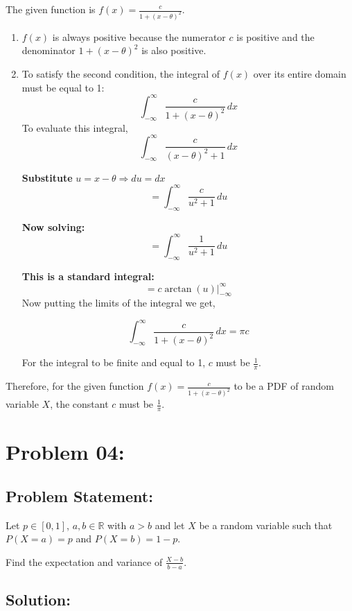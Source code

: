 \documentclass{article}
\theoremstyle{definition}
\begin{document}
The given function is $f(x) = \frac{c}{1 + (x - \theta)^2}$.

\begin{enumerate}
  \item $f(x)$ is always positive because the numerator $c$ is positive and the denominator $1 + (x - \theta)^2$ is also positive.
  \item To satisfy the second condition, the integral of $f(x)$ over its entire domain must be equal to 1:
  \[
  \int_{-\infty}^{\infty} \frac{c}{1 + (x - \theta)^2} \,dx
  \]
  To evaluate this integral,
  \[
    \int_{-\infty}^{\infty} \frac{c}{(x - \theta)^2 + 1} \, dx
\]

\textbf{Substitute} \(u = x - \theta \Rightarrow du = dx\) 
\[
= \int_{-\infty}^{\infty} \frac{c}{u^2 + 1} \, du
\]

\textbf{Now solving:}
\[
= \int_{-\infty}^{\infty} \frac{1}{u^2 + 1} \, du
\]
 
\textbf{This is a standard integral:}
\[ 
= c \arctan(u)|_{-\infty}^{\infty}
\]
Now putting the limits of the integral we get,

\[
  \int_{-\infty}^{\infty} \frac{c}{1 + (x - \theta)^2} \,dx = {\pi}c
  \]

  
  For the integral to be finite and equal to 1, $c$ must be ${\frac{1}{\pi}}$.
\end{enumerate}

Therefore, for the given function $f(x) = \frac{c}{1 + (x - \theta)^2}$ to be a PDF of random variable $X$, the constant $c$ must be ${\frac{1}{\pi}}$.


\section{Problem 04:}
\begin{mdframed}[style = MyFrame]
    \subsection{Problem Statement:}
   Let $p \in [0,1]$, $a,b \in \mathbb{R}$ with $a > b$ and let $X$ be a random variable such that $P(X = a) = p$ and $P(X = b) = 1 - p$.

Find the expectation and variance of $\frac{X-b}{b-a}$.

\end{mdframed}
\subsection{Solution:}
\end{document}
